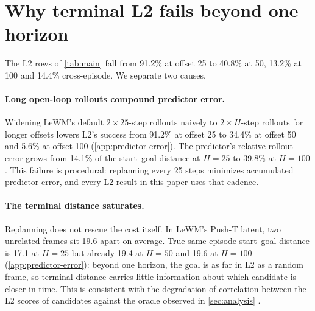 \documentclass{article} %
\newcommand{\keypoints}[1]{\par\medskip\noindent\fcolorbox{black!50}{black!5}{\begin{minipage}{0.96\linewidth}\small
\textbf{Key points this section must land.}\begin{itemize}[nosep,leftmargin=1.2em]#1\end{itemize}\end{minipage}}\par\medskip}
\begin{document}
\section{Why terminal L2 fails beyond one horizon}
\label{sec:problem}
The L2 rows of \cref{tab:main} fall from 91.2\% at offset 25 to 40.8\% at 50, 13.2\% at 100 and
14.4\% cross-episode. We separate two causes.

\paragraph{Long open-loop rollouts compound predictor error.}
Widening LeWM's default $2\times25$-step rollouts naively to $2\times H$-step rollouts for longer offsets
lowers L2's success from 91.2\% at offset 25 to 34.4\% at offset 50 and 5.6\% at offset 100
(\cref{app:predictor-error}). The predictor's relative rollout error grows from 14.1\% of the start--goal
distance at $H=25$ to 39.8\% at $H=100$. This failure is procedural: replanning every 25 steps minimizes accumulated predictor error, and every L2 result in this paper uses that cadence.

\paragraph{The terminal distance saturates.}
Replanning does not rescue the cost itself. In LeWM's Push-T latent, two unrelated frames sit
19.6 apart on average. True same-episode start--goal distance is 17.1 at $H=25$ but already
19.4 at $H=50$ and 19.6 at $H=100$ (\cref{app:predictor-error}): beyond one horizon, the goal is
as far in L2 as a random frame, so terminal distance carries little information about which
candidate is closer in time. This is consistent with the degradation of correlation between the L2 scores of candidates against the oracle observed in \cref{sec:analysis} .
\end{document}
